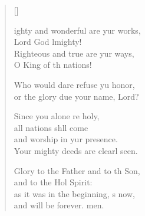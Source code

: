 \settowidth{\versewidth}{Mighty and wonderful are your works, *}
\begin{verse}[\versewidth]
  \begin{patverse}
ighty and wonderful are yur works,\Med\\
Lord God lmighty!\\
Righteous and true are yur ways,\Med\\
O King of th nations!

Who would dare refuse yu honor,\Med\\
or the glory due your name,  Lord?

Since you alone re holy,\Med\\
all nations shll come\\
and worship in yur presence.\Med\\
Your mighty deeds are clearl seen.

Glory to the Father and to th Son,\Med\\
and to the Hol Spirit:\\
as it was in the beginning, \pointup{\i}s now,\Med\\
and will be forever. men.
  \end{patverse}
\end{verse}
